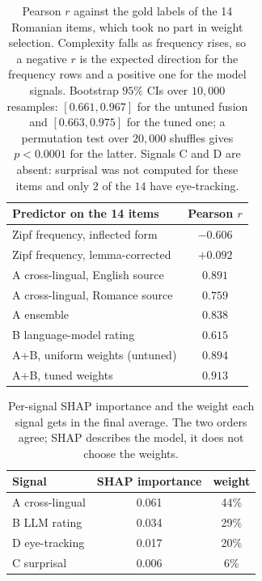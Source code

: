 \documentclass[11pt]{article}
\begin{document}
\begin{table}[tbp]
\centering\small
\begin{tabular}{lc}
\toprule
\textbf{Predictor on the 14 items} & \textbf{Pearson $r$} \\
\midrule
Zipf frequency, inflected form & $-0.606$ \\
Zipf frequency, lemma-corrected & $+0.092$ \\
\midrule
A cross-lingual, English source & $0.891$ \\
A cross-lingual, Romance source & $0.759$ \\
A ensemble & $0.838$ \\
B language-model rating & $0.615$ \\
\midrule
A+B, uniform weights (untuned) & $0.894$ \\
A+B, tuned weights & $\mathbf{0.913}$ \\
\bottomrule
\end{tabular}
\caption{Pearson $r$ against the gold labels of the 14 Romanian items, which took no part in weight selection.
Complexity falls as frequency rises, so a negative $r$ is the expected direction for the frequency rows and a
positive one for the model signals. Bootstrap $95\%$ CIs over $10{,}000$ resamples: $[0.661, 0.967]$ for the
untuned fusion and $[0.663, 0.975]$ for the tuned one; a permutation test over $20{,}000$ shuffles gives
$p < 0.0001$ for the latter. Signals C and D are absent: surprisal was not computed for these items and only $2$
of the $14$ have eye-tracking.}
\label{tab:ro14}
\end{table}

\begin{table}[tbp]
\centering\small
\begin{tabular}{lcc}
\toprule
\textbf{Signal} & \textbf{SHAP importance} & \textbf{weight} \\
\midrule
A cross-lingual & 0.061 & 44\% \\
B LLM rating & 0.034 & 29\% \\
D eye-tracking & 0.017 & 20\% \\
C surprisal & 0.006 & 6\% \\
\bottomrule
\end{tabular}
\caption{Per-signal SHAP importance and the weight each signal gets in the final average. The two orders agree;
SHAP describes the model, it does not choose the weights.}
\label{tab:signals}
\end{table}
\end{document}
